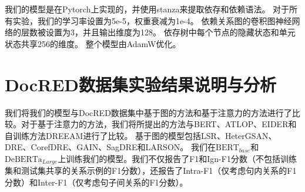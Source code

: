 \documentclass[bachelor]{thesis-uestc}
\begin{document}
我们的模型是在Pytorch\cite{paszke2019pytorch}上实现的，并使用stanza\cite{qi2020stanza}来提取依存和依赖语法。
对于所有实验，我们的学习率设置为5e-5，权重衰减为1e-4。
依赖关系图的卷积图神经网络的层数被设置为3，并且输出维度为128。
依存树中每个节点的隐藏状态和单元状态共享256的维度。
整个模型由AdamW优化。

\section{DocRED数据集实验结果说明与分析}\label{sec:docred}

我们将我们的模型与DocRED数据集中基于图的方法和基于注意力的方法进行了比较。对于基于注意力的方法，我们将所提出的方法与BERT\cite{DOCRED}、ATLOP\cite{zhou2021document}、EIDER\cite{xie2022eider}和自训练方法DREEAM\cite{ma-etal-2023-DREEAM}进行了比较。
基于图的模型包括LSR\cite{nan-etal-2020-reasoning}、HeterGSAN\cite{zhang-etal-2020-document}、DRE\cite{xu-etal-2021-discriminative}、CorefDRE\cite{xue2022corefdre}、GAIN\cite{GAIN}、SagDRE\cite{SagDRE}和LARSON\cite{duan-etal-2022-just}。
我们在$\mathrm{BERT}_{base}$和$\mathrm{DeBERTa}_{Large}$上训练我们的模型。我们不仅报告了F1和Ign-F1分数（不包括训练集和测试集共享的关系示例的F1分数），还报告了Intra-F1（仅考虑句内关系的F1分数）和Inter-F1（仅考虑句子间关系的F1分数）。\par
\end{document}
